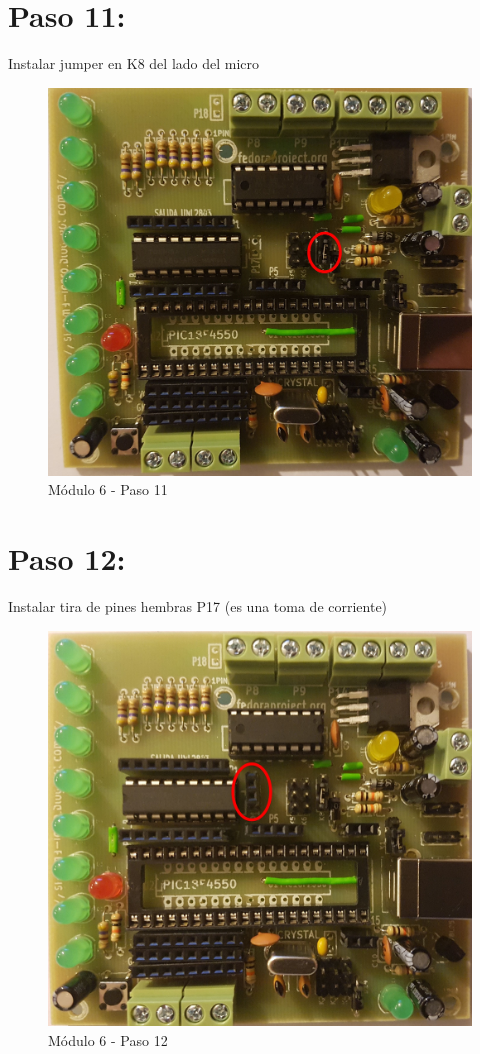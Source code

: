 \newpage

\section{Paso 11:}

Instalar jumper en K8 del lado del micro

\begin{figure}[h]
	\centering
	\includegraphics[width=0.8\linewidth]{Modulo_6/M6_11}
	\caption{Módulo 6 - Paso 11}
	\label{fig:M6_11}
\end{figure}

\newpage

\section{Paso 12:}

Instalar tira de pines hembras P17 (es una toma de corriente)

\begin{figure}[h]
	\centering
	\includegraphics[width=0.8\linewidth]{Modulo_6/M6_12}
	\caption{Módulo 6 - Paso 12}
	\label{fig:M6_12}
\end{figure}

